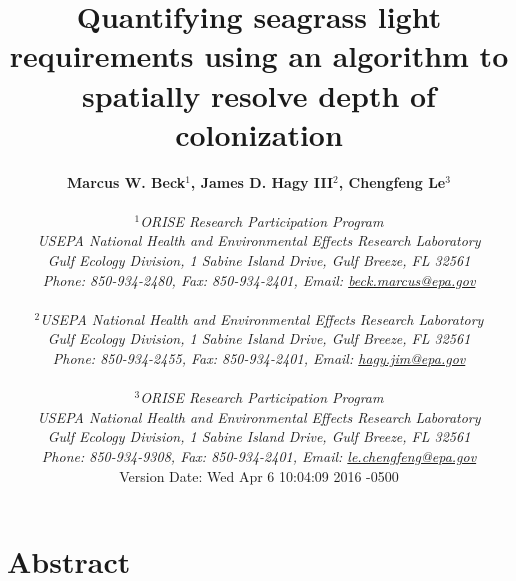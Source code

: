 \documentclass[letterpaper,12pt,oneside]{article}\usepackage[]{graphicx}\usepackage[]{color}
\begin{document}
\raggedbottom
\linenumbers
\raggedright
{}
\setlength{\parindent}{0.5in}
\renewcommand\refname{References \vspace{12pt}}

\begin{singlespace}
\title{{\bf {\Large Quantifying seagrass light requirements using an algorithm to spatially resolve depth of colonization}}}
\author{
  {\bf {\normalsize Marcus W. Beck$^1$, James D. Hagy III$^2$, Chengfeng Le$^3$}}
  \\\\{\textit {\normalsize $^1$ORISE Research Participation Program}}
  \\{\textit {\normalsize USEPA National Health and Environmental Effects Research Laboratory}}
  \\{\textit {\normalsize Gulf Ecology Division, 1 Sabine Island Drive, Gulf Breeze, FL 32561}}
	\\{\textit {\normalsize Phone: 850-934-2480, Fax: 850-934-2401, Email: \href{mailto:beck.marcus@epa.gov}{beck.marcus@epa.gov}}}
  \\\\{\textit {\normalsize $^2$USEPA National Health and Environmental Effects Research Laboratory}}
	\\{\textit {\normalsize Gulf Ecology Division, 1 Sabine Island Drive, Gulf Breeze, FL 32561}}
	\\{\textit {\normalsize Phone: 850-934-2455, Fax: 850-934-2401, Email: \href{mailto:hagy.jim@epa.gov}{hagy.jim@epa.gov}}}
  \\\\{\textit {\normalsize $^3$ORISE Research Participation Program}}
  \\{\textit {\normalsize USEPA National Health and Environmental Effects Research Laboratory}}
  \\{\textit {\normalsize Gulf Ecology Division, 1 Sabine Island Drive, Gulf Breeze, FL 32561}}
  \\{\textit {\normalsize Phone: 850-934-9308, Fax: 850-934-2401, Email: \href{mailto:le.chengfeng@epa.gov}{le.chengfeng@epa.gov}}}
  \vspace{1in} 
  \\ Version Date:   Wed Apr 6 10:04:09 2016 -0500
	}
\date{}
\maketitle
\end{singlespace}
\clearpage

\section*{Abstract}
\end{document}
